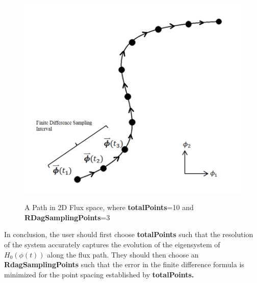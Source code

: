 \documentclass[12pt]{article}
\begin{document}
\begin{figure}
\centering \includegraphics[scale=0.4]{rdagp.png}
\label{pathInFluxSpace}
\caption{A Path in 2D Flux space, where \textbf{totalPoints}=10 and \textbf{RDagSamplingPoints}=3}
\end{figure}
\newline
\newline
In conclusion, the user should first choose \textbf{totalPoints} such that the resolution of the system accurately captures the evolution of the eigensystem of $H_0(\phi(t))$ along the flux path. They should then choose an \textbf{RdagSamplingPoints} such that the error in the finite difference formula is minimized for the point spacing established by \textbf{totalPoints.}
\end{document}
